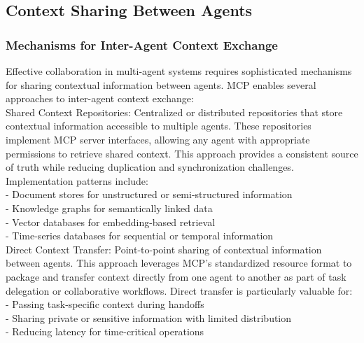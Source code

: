 \subsection{Context Sharing Between Agents}
\subsubsection{Mechanisms for Inter-Agent Context Exchange}
Effective collaboration in multi-agent systems requires sophisticated mechanisms for sharing contextual information between agents. MCP enables several approaches to inter-agent context exchange:\\ \newline
Shared Context Repositories: Centralized or distributed repositories that store contextual information accessible to multiple agents. These repositories implement MCP server interfaces, allowing any agent with appropriate permissions to retrieve shared context. This approach provides a consistent source of truth while reducing duplication and synchronization challenges. Implementation patterns include:\\ \newline
- Document stores for unstructured or semi-structured information\\ \newline
- Knowledge graphs for semantically linked data\\ \newline
- Vector databases for embedding-based retrieval\\ \newline
- Time-series databases for sequential or temporal information\\ \newline
Direct Context Transfer: Point-to-point sharing of contextual information between agents. This approach leverages MCP's standardized resource format to package and transfer context directly from one agent to another as part of task delegation or collaborative workflows. Direct transfer is particularly valuable for:\\ \newline
- Passing task-specific context during handoffs\\ \newline
- Sharing private or sensitive information with limited distribution\\ \newline
- Reducing latency for time-critical operations\\ \newline
